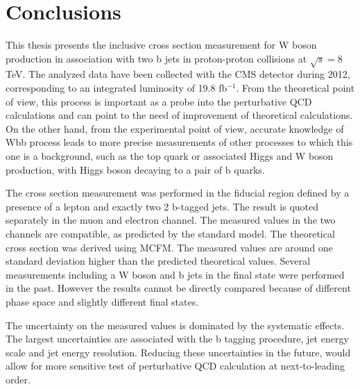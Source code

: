 
\chapter{Conclusions} %

\label{Chapter8} %


This thesis presents the inclusive cross section measurement for W boson production in association with two b jets in proton-proton collisions at $\sqrt{s}=$8 TeV. The analyzed data have been collected with the CMS detector during 2012, corresponding to an integrated luminosity of 19.8 fb$^{-1}$. From the theoretical point of view, this process is important as a probe into the perturbative QCD calculations and can point to the need of improvement of theoretical calculations. On the other hand, from the experimental  point of view, accurate  knowledge of Wbb process leads to more precise measurements of other processes to which this one is a background, such as the top quark or associated Higgs and W boson production, with Higgs boson  decaying to a pair of b quarks.

\par The cross section measurement was performed in the fiducial region defined by a presence of a lepton and exactly two 2 b-tagged jets. The result is quoted separately in the muon and electron channel. The measured values in the two channels are compatible, as predicted by the standard model. The theoretical cross section was derived using MCFM. The measured values are around one standard deviation higher than the predicted theoretical values. Several measurements including a W boson and b jets in the final state were performed in the past. However the results cannot be directly compared because of different phase space and slightly different final states.

The uncertainty on the measured values is dominated by the systematic effects. The largest uncertainties are associated with the b tagging procedure, jet energy scale and jet energy resolution. Reducing these uncertainties in the future, would allow for more sensitive test of perturbative QCD calculation at next-to-leading order.

